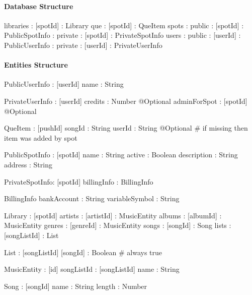 \paragraph{Database Structure}
\begin{code}
libraries : [spotId] : Library
que : [spotId] : QueItem
spots : public : [spotId] : PublicSpotInfo
      : private : [spotId] : PrivateSpotInfo
users : public : [userId] : PublicUserInfo
      : private : [userId] : PrivateUserInfo
\end{code}


\paragraph{Entities Structure}
\begin{code}
PublicUserInfo : [userId]
    name : String

PrivateUserInfo : [userId]
    credits : Number @Optional
    adminForSpot : [spotId] @Optional

QueItem : [pushId]
    songId : String
    userId : String @Optional # if missing then item was added by spot
    
PublicSpotInfo : [spotId] 
    name : String
    active : Boolean
    description : String
    address : String

PrivateSpotInfo: [spotId]
    billingInfo : BillingInfo

BillingInfo
    bankAccount : String
    variableSymbol : String
    
Library : [spotId]
    artists : [artistId] : MusicEntity
    albums : [albumId] : MusicEntity
    genres : [genreId] : MusicEntity
    songs : [songId] : Song
    lists : [songListId] : List
    
List : [songListId]
    [songId] : Boolean # always true
    
MusicEntity : [id]
    songListId : [songListId]
    name : String

Song : [songId]
    name : String
    length : Number
\end{code}